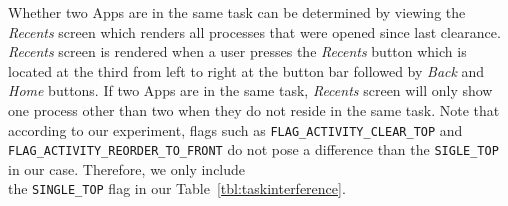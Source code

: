 \documentclass[letterpaper,12pt]{article}
\begin{document}
Whether two Apps are in the same task can be determined by
viewing the \emph{Recents} screen which renders all processes that
were opened since last clearance\cite{recents}. \emph{Recents} screen
is rendered when a user presses the \emph{Recents} button which is
located at the third from left to right at the button bar followed by
\emph{Back} and \emph{Home} buttons. If two Apps are in the same task,
\emph{Recents} screen will only show one process other than two when
they do not reside in the same task. Note that according to our
experiment, flags such as \texttt{FLAG\_ACTIVITY\_CLEAR\_TOP} and
\texttt{FLAG\_ACTIVITY\_REORDER\_TO\_FRONT} do not pose a difference
than the \texttt{SIGLE\_TOP} in our case. Therefore, we only include\\
the \texttt{SINGLE\_TOP} flag in our Table~\ref{tbl:taskinterference}.
\end{document}
